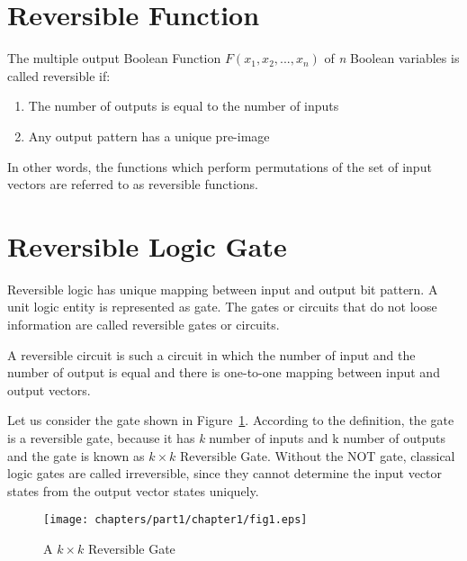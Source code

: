 \section{Reversible Function}
The multiple output Boolean Function $F(x_1, x_2, ...,x_n)$ of \textit{n} Boolean variables is called reversible if:
\begin{enumerate}
	\item The number of outputs is equal to the number of inputs
	\item Any output pattern has a unique pre-image
\end{enumerate}


In other words, the functions which perform permutations of the set of input vectors are referred to as reversible functions.

\section{Reversible Logic Gate}
Reversible logic has unique mapping between input and output bit pattern. A unit logic entity is represented as gate. The gates or circuits that do not loose information are called reversible gates or circuits.

\begin{property}\textnormal{
A reversible circuit is such a circuit in which the number of input and the number of output is equal and there is one-to-one mapping between input and output vectors.}
\end{property}
 
Let us consider the gate shown in Figure~\ref{fig:p1_c1_fig1}. According to the definition, the gate is a reversible gate, because it has \textit{k} number of inputs and k number of outputs and the gate is known as $k \times k$ Reversible Gate. Without the NOT gate, classical logic gates are called irreversible, since they cannot determine the input vector states from the output vector states uniquely.
\begin{figure}[H]
	\centering
	\texttt{[image: chapters/part1/chapter1/fig1.eps]}
	\caption{A $k \times k$ Reversible Gate}
	\label{fig:p1_c1_fig1}
\end{figure}

